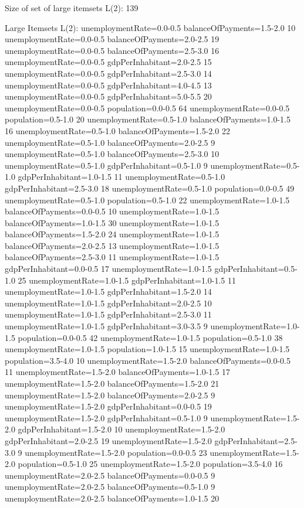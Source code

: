 Size of set of large itemsets L(2): 139

Large Itemsets L(2):
unemploymentRate=0.0-0.5 balanceOfPayments=1.5-2.0 10
unemploymentRate=0.0-0.5 balanceOfPayments=2.0-2.5 19
unemploymentRate=0.0-0.5 balanceOfPayments=2.5-3.0 16
unemploymentRate=0.0-0.5 gdpPerInhabitant=2.0-2.5 15
unemploymentRate=0.0-0.5 gdpPerInhabitant=2.5-3.0 14
unemploymentRate=0.0-0.5 gdpPerInhabitant=4.0-4.5 13
unemploymentRate=0.0-0.5 gdpPerInhabitant=5.0-5.5 20
unemploymentRate=0.0-0.5 population=0.0-0.5 64
unemploymentRate=0.0-0.5 population=0.5-1.0 20
unemploymentRate=0.5-1.0 balanceOfPayments=1.0-1.5 16
unemploymentRate=0.5-1.0 balanceOfPayments=1.5-2.0 22
unemploymentRate=0.5-1.0 balanceOfPayments=2.0-2.5 9
unemploymentRate=0.5-1.0 balanceOfPayments=2.5-3.0 10
unemploymentRate=0.5-1.0 gdpPerInhabitant=0.5-1.0 9
unemploymentRate=0.5-1.0 gdpPerInhabitant=1.0-1.5 11
unemploymentRate=0.5-1.0 gdpPerInhabitant=2.5-3.0 18
unemploymentRate=0.5-1.0 population=0.0-0.5 49
unemploymentRate=0.5-1.0 population=0.5-1.0 22
unemploymentRate=1.0-1.5 balanceOfPayments=0.0-0.5 10
unemploymentRate=1.0-1.5 balanceOfPayments=1.0-1.5 30
unemploymentRate=1.0-1.5 balanceOfPayments=1.5-2.0 24
unemploymentRate=1.0-1.5 balanceOfPayments=2.0-2.5 13
unemploymentRate=1.0-1.5 balanceOfPayments=2.5-3.0 11
unemploymentRate=1.0-1.5 gdpPerInhabitant=0.0-0.5 17
unemploymentRate=1.0-1.5 gdpPerInhabitant=0.5-1.0 25
unemploymentRate=1.0-1.5 gdpPerInhabitant=1.0-1.5 11
unemploymentRate=1.0-1.5 gdpPerInhabitant=1.5-2.0 14
unemploymentRate=1.0-1.5 gdpPerInhabitant=2.0-2.5 10
unemploymentRate=1.0-1.5 gdpPerInhabitant=2.5-3.0 11
unemploymentRate=1.0-1.5 gdpPerInhabitant=3.0-3.5 9
unemploymentRate=1.0-1.5 population=0.0-0.5 42
unemploymentRate=1.0-1.5 population=0.5-1.0 38
unemploymentRate=1.0-1.5 population=1.0-1.5 15
unemploymentRate=1.0-1.5 population=3.5-4.0 10
unemploymentRate=1.5-2.0 balanceOfPayments=0.0-0.5 11
unemploymentRate=1.5-2.0 balanceOfPayments=1.0-1.5 17
unemploymentRate=1.5-2.0 balanceOfPayments=1.5-2.0 21
unemploymentRate=1.5-2.0 balanceOfPayments=2.0-2.5 9
unemploymentRate=1.5-2.0 gdpPerInhabitant=0.0-0.5 19
unemploymentRate=1.5-2.0 gdpPerInhabitant=0.5-1.0 9
unemploymentRate=1.5-2.0 gdpPerInhabitant=1.5-2.0 10
unemploymentRate=1.5-2.0 gdpPerInhabitant=2.0-2.5 19
unemploymentRate=1.5-2.0 gdpPerInhabitant=2.5-3.0 9
unemploymentRate=1.5-2.0 population=0.0-0.5 23
unemploymentRate=1.5-2.0 population=0.5-1.0 25
unemploymentRate=1.5-2.0 population=3.5-4.0 16
unemploymentRate=2.0-2.5 balanceOfPayments=0.0-0.5 9
unemploymentRate=2.0-2.5 balanceOfPayments=0.5-1.0 9
unemploymentRate=2.0-2.5 balanceOfPayments=1.0-1.5 20
